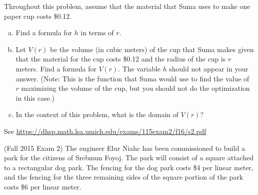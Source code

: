 \documentclass[11pt]{exam}
\begin{document}
\begin{questions}
Throughout this problem, assume that the material that Suma uses to make one paper cup costs \$0.12.
\begin{enumerate}[(a)]
	\item Find a formula for $h$ in terms of $r$.
	\item Let $V (r)$ be the volume (in cubic meters) of the cup that Suma makes given that the material for the cup costs \$0.12 and the radius of the cup is $r$ meters. Find a formula for $V (r)$. The variable $h$ should not appear in your answer.
(Note: This is the function that Suma would use to find the value of $r$ maximizing the volume of the cup, but you should not do the optimization in this case.)
\item In the context of this problem, what is the domain of $V (r)$?
\end{enumerate}
\begin{solution}
  See \href{https://dhsp.math.lsa.umich.edu/exams/115exam2/f16/s2.pdf}{https://dhsp.math.lsa.umich.edu/exams/115exam2/f16/s2.pdf}
\end{solution}
\pagebreak
\question (Fall 2015 Exam 2) %
The engineer Elur Niahc has been commissioned to build a park for the citizens of Srebmun Foyoj. The park will consist of a square attached to a rectangular dog park. The fencing for the dog park costs \$4 per linear meter, and the fencing for the three remaining sides of the square portion of the park costs \$6 per linear meter.





\end{questions}
\end{document}

